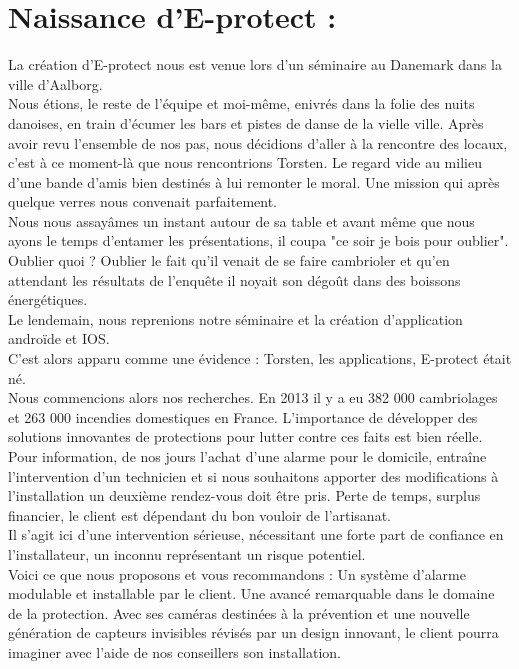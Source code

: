 \chapter{Naissance d'E-protect :}

La création d'E-protect nous est venue lors d'un séminaire au Danemark dans la ville d'Aalborg.\\
Nous étions, le reste de l'équipe et moi-même, enivrés dans la folie des nuits danoises, en train d'écumer les bars et pistes de danse de la vielle ville. Après avoir revu l'ensemble de nos pas, nous décidions d'aller à la rencontre des locaux, c'est à ce moment-là que nous rencontrions Torsten. Le regard vide au milieu d'une bande d'amis bien destinés à lui remonter le moral. Une mission qui après quelque verres nous convenait parfaitement.\\
Nous nous assayâmes un instant autour de sa table et avant même que nous ayons le temps d'entamer les présentations, il coupa "ce soir je bois pour oublier". Oublier quoi ? Oublier le fait qu'il venait de se faire cambrioler et qu'en attendant les résultats de l'enquête il noyait son dégoût dans des boissons énergétiques.\\

Le lendemain, nous reprenions notre séminaire et la création d'application androïde et IOS.\\

C'est alors apparu comme une évidence : Torsten, les applications, E-protect était né.\\

Nous commencions alors nos recherches. En 2013 il y a eu 382 000 cambriolages et 263 000 incendies domestiques en France. L'importance de développer des solutions innovantes de protections pour lutter contre ces faits est bien réelle.\\

Pour information, de nos jours l'achat d'une alarme pour le domicile, entraîne l'intervention d'un technicien et si nous souhaitons apporter des modifications à l'installation un deuxième rendez-vous doit être pris. Perte de temps, surplus financier, le client est dépendant du bon vouloir de l'artisanat.\\

Il s'agit ici d'une intervention sérieuse, nécessitant une forte part de confiance en l'installateur, un inconnu représentant un risque potentiel.\\

Voici ce que nous proposons et vous recommandons : Un système d'alarme modulable et installable par le client. Une avancé remarquable dans le domaine de la protection. Avec ses caméras destinées à la prévention et une nouvelle génération de capteurs invisibles révisés par un design innovant, le client pourra imaginer avec l'aide de nos conseillers son installation.\\

